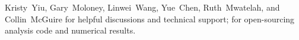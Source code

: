 \small\centering
Kristy~Yiu, Gary~Moloney, Linwei~Wang, Yue~Chen, Ruth~Mwatelah, and Collin~McGuire for helpful discussions and technical support;
\citet{Prem2021} for open-sourcing analysis code and numerical results.
\bigskip\bigskip\par
\newcommand{\thankslogo}[2]{\raisebox{\dimexpr-#1mm/2}{{\texttt{[image: \#2]}}}}
\thankslogo{16}{nserc}\hfill
\thankslogo{16}{on}\hfill
\thankslogo{13}{smh}\hfill
\thankslogo{16}{uoft}\hfill
\thankslogo{14}{map}\hfill
\bigskip